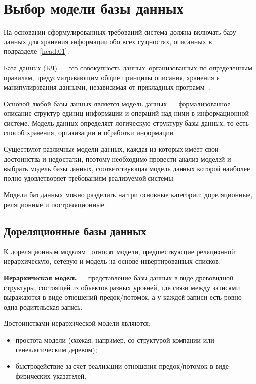 \section{Выбор модели базы данных}

На основании сформулированных требований система должна включать базу данных для
хранения информации обо всех сущностях, описанных в подразделе~\ref{head:01}.

База данных (БД) --- это совокупность данных, организованных по определенным
правилам, предусматривающим общие принципы описания, хранения и манипулирования
данными, независимая от прикладных программ~\cite{gost01}.

Основой любой базы данных является модель данных --- формализованное описание
структур единиц информации и операций над ними в информационной системе.
Модель данных определяет логическую структуру базы данных, то есть
способ хранения, организации и обработки информации~\cite{book01}.

Существуют различные модели данных, каждая из которых имеет свои достоинства и
недостатки, поэтому необходимо провести анализ моделей и выбрать модель базы
данных, соответствующая модель данных которой наиболее полно удовлетворяет
требованиям реализуемой системы.

Модели баз данных можно разделить на три основные категории: дореляционные,
реляционные и постреляционные.

\subsection{Дореляционные базы данных}

К дореляционным моделям~\cite{book03} относят модели, предшествующие
реляционной: иерархическую, сетевую и модель на основе инвертированных
списков.

\textbf{Иерархическая модель}  --- представление базы данных в виде древовидной
структуры, состоящей из объектов разных уровней, где связи между записями
выражаются в виде отношений предок/потомок, а у каждой записи есть ровно одна
родительская запись.

Достоинствами иерархической модели являются:
\begin{itemize}
    \item простота модели (схожая, например, со структурой компании или
        генеалогическим деревом);
    \item быстродействие за счет реализации отношения предок/потомок в виде
        физических указателей.
\end{itemize}

